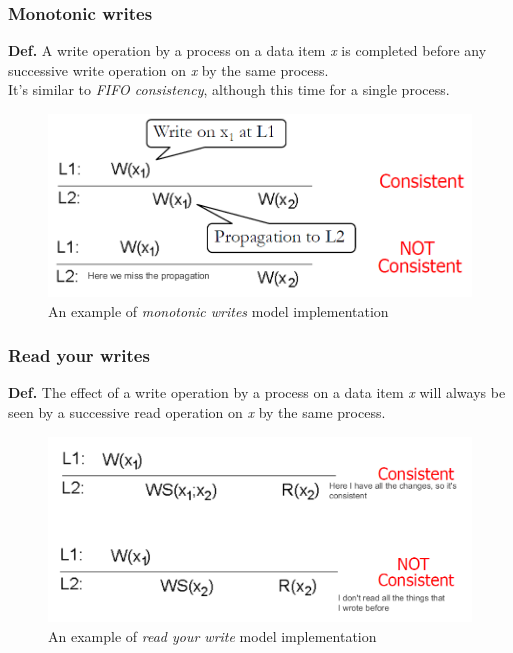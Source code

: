 \subsubsection{Monotonic writes}

\textbf{Def.} A write operation by a process on a data item \emph{x} is
completed before any successive write operation on \emph{x} by the same
process.\\
It's similar to \emph{FIFO consistency}, although this time for a single
process.

\begin{figure}[htbp]
    \centering
    \includegraphics[width=\textwidth]{src/images/consistency-replication/monotonic-writes.png}
    \caption{An example of \textit{monotonic writes} model implementation}
\end{figure}

\subsubsection{Read your writes}

\textbf{Def.} The effect of a write operation by a process on a data
item \emph{x} will always be seen by a successive read operation on
\emph{x} by the same process.

\begin{figure}[htbp]
    \centering
    \includegraphics[width=\textwidth]{src/images/consistency-replication/read-your-writes.png}
    \caption{An example of \textit{read your write} model implementation}
\end{figure}

